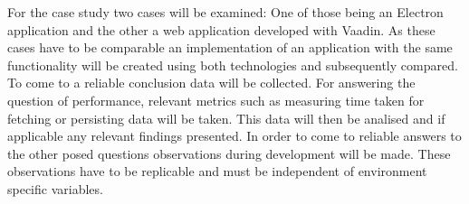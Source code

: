 For the case study two cases will be examined: 
One of those being an Electron application and the other a web application 
developed with Vaadin. 
As these cases have to be comparable an implementation of an application with the same functionality 
will be created using both technologies and subsequently compared.
To come to a reliable conclusion data will be collected.
For answering the question of performance, relevant metrics such as measuring time taken for fetching or 
persisting data will be taken. 
This data will then be analised and if applicable any relevant findings presented.
In order to come to reliable answers to the other posed questions observations during development 
will be made.
These observations have to be replicable and must be independent of environment specific variables.